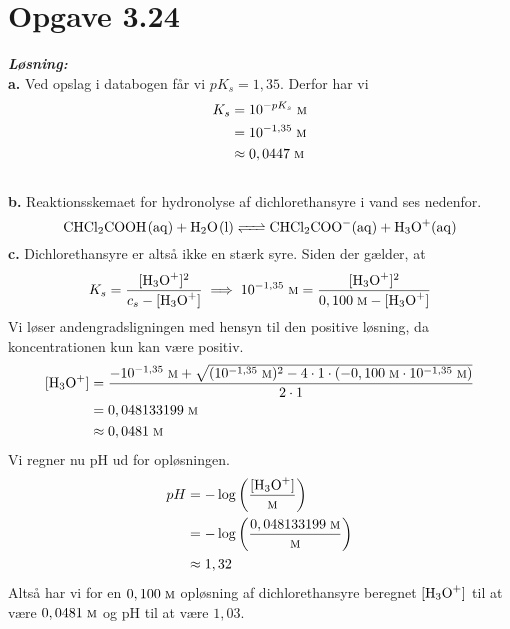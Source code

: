 \documentclass{report}
\newcommand{\sol}{\setlength{\parindent}{0cm}\textbf{\textit{Løsning:}}\setlength{\parindent}{1cm}}
\begin{document}
\section*{Opgave 3.24}
\sol \\
\textbf{a.}
Ved opslag i databogen får vi $pK_s=1,35$.
Derfor har vi 
\begin{equation*}
\begin{split}
K_s&=10^{-pK_s} \;\unit{\textsc{m}} \\ 
&=10^{-1,35} \;\unit{\textsc{m}} \\ 
&\approx 0,0447 \;\unit{\textsc{m}} 
\end{split}
\end{equation*}
\\[1ex]
\textbf{b.}
Reaktionsskemaet for hydronolyse af dichlorethansyre i vand ses nedenfor.
\[
\ce{CHCl2COOH(aq) + H2O(l) <=> CHCl2COO-(aq) + H3O+(aq)} 
\] 
\textbf{c.}
Dichlorethansyre er altså ikke en stærk syre.
Siden der gælder, at 
\begin{equation*}
\begin{split}
  K_s=\frac{[\ce{H3O+} ]^2}{c_s-[\ce{H3O+} ]} \implies 10^{-1,35} \;\unit{\textsc{m}} =\frac{[\ce{H3O+} ]^2}{0,100 \;\unit{\textsc{m}} - [\ce{H3O+} ]}
\end{split}
\end{equation*}
Vi løser andengradsligningen med hensyn til den positive løsning, da koncentrationen kun kan være positiv.
\begin{equation*}
\begin{split}
  [\ce{ H3O+}] &= \frac{-10^{-1,35} \;\unit{\textsc{m}} + \sqrt{(10^{-1,35}\;\unit{\textsc{m}} )^2-4 \cdot 1 \cdot (-0,100 \;\unit{\textsc{m}} \cdot 10^{-1,35} \;\unit{\textsc{m}} )} }{2 \cdot 1}\\ 
  &=0,048133199 \;\unit{\textsc{m}} \\ 
  &\approx 0,0481 \;\unit{\textsc{m}} 
\end{split}
\end{equation*}
Vi regner nu pH ud for opløsningen.
\begin{equation*}
\begin{split}
  pH&=-\log \left(\frac{[\ce{ H3O+}]}{\textsc{m}}\right) \\ 
  &=-\log \left(\frac{0,048133199 \;\unit{\textsc{m}} }{\textsc{m}}\right) \\ 
  &\approx 1,32
\end{split}
\end{equation*}
Altså har vi for en $0,100 \;\unit{\textsc{m}} $ opløsning af dichlorethansyre beregnet $[\ce{H3O+} ]$ til at være $0,0481 \;\unit{\textsc{m}} $ og pH til at være $1,03$.\\[1ex]
\end{document}
